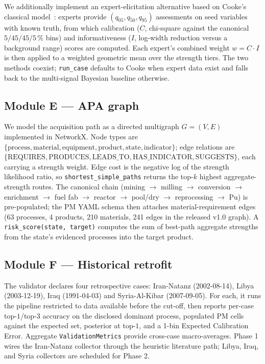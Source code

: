 \documentclass[11pt,a4paper]{article}
\begin{document}
We additionally implement an expert-elicitation alternative based on
Cooke's classical model~\cite{Cooke1991}: experts provide $(q_{05},
q_{50}, q_{95})$ assessments on seed variables with known truth, from
which calibration ($C$, chi-square against the canonical
$5/45/45/5\,\%$ bins) and informativeness ($I$, log-width reduction
versus a background range) scores are computed. Each expert's combined
weight $w = C \cdot I$ is then applied to a weighted geometric mean
over the strength tiers. The two methods coexist; \texttt{run\_case}
defaults to Cooke when expert data exist and falls back to the
multi-signal Bayesian baseline otherwise.

\subsection{Module E --- APA graph}\label{sec:apa}
We model the acquisition path as a directed multigraph $G=(V, E)$
implemented in NetworkX. Node types are
$\{\text{process}, \text{material}, \text{equipment},
\text{product}, \text{state}, \text{indicator}\}$;
edge relations are
$\{\text{REQUIRES}, \text{PRODUCES}, \text{LEADS\_TO},
\text{HAS\_INDICATOR}, \text{SUGGESTS}\}$, each carrying a strength
weight. Edge cost is the negative log of the strength likelihood ratio,
so \texttt{shortest\_simple\_paths} returns the top-$k$ highest
aggregate-strength routes. The canonical chain (mining $\to$ milling
$\to$ conversion $\to$ enrichment $\to$ fuel fab $\to$ reactor
$\to$ pool/dry $\to$ reprocessing $\to$ Pu) is pre-populated; the PM
YAML schema then attaches material-requirement edges
(63 processes, 4 products, 210 materials, 241 edges in the
released v1.0 graph). A \texttt{risk\_score(state, target)} computes the
sum of best-path aggregate strengths from the state's evidenced
processes into the target product.

\subsection{Module F --- Historical retrofit}\label{sec:validator}
The validator declares four retrospective cases: Iran-Natanz
(2002-08-14), Libya (2003-12-19), Iraq (1991-04-03) and Syria-Al-Kibar
(2007-09-05). For each, it runs the pipeline restricted to
data available before the cut-off, then reports per-case
top-$1$/top-$3$ accuracy on the disclosed dominant process, populated
PM cells against the expected set, posterior at top-$1$, and a 1-bin
Expected Calibration Error. Aggregate \texttt{ValidationMetrics}
provide cross-case macro-averages. Phase 1 wires the Iran-Natanz
collector through the heuristic literature path; Libya, Iraq, and
Syria collectors are scheduled for Phase 2.
\end{document}
